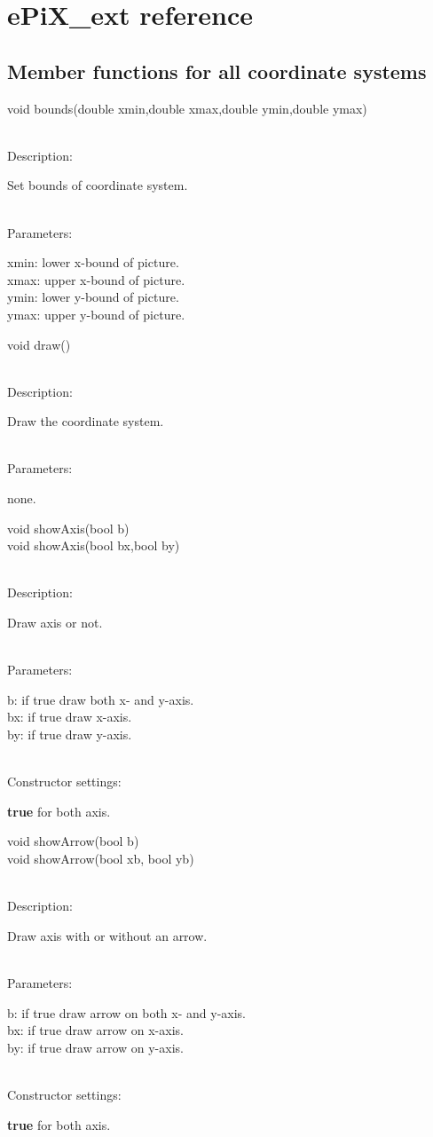 \documentclass[12pt,a4paper]{article}
\newcommand{\memberitem}[1]{
                              \vspace{-0.5pc}
                              \end{minipage}\\
                              \phantom{M}#1:\\
                              \phantom{MM}
                              \begin{minipage}[t]{12cm}

                           }
\newcommand{\memdsc}{\memberitem{Description}}
\newcommand{\meminp}{\memberitem{Parameters}}
\newcommand{\memdef}{\memberitem{Constructor settings}}
\newenvironment{MemberDescr}
  {
    \begin{minipage}{15cm}
    \bf
  }
  {
    \end{minipage}
  }
\begin{document}
  \section{ePiX\_ext reference}

  \subsection{Member functions for all coordinate systems}

  \begin{MemberDescr}
    void bounds(double xmin,double xmax,double ymin,double ymax)\\
    \memdsc
      Set bounds of coordinate system.\\
    \meminp
      xmin: lower x-bound of picture.\\
      xmax: upper x-bound of picture.\\
      ymin: lower y-bound of picture.\\
      ymax: upper y-bound of picture.\\
  \end{MemberDescr}

  \begin{MemberDescr}
    void draw()\\
    \memdsc
      Draw the coordinate system.\\
    \meminp
      none.\\
  \end{MemberDescr}

  \begin{MemberDescr}
    void showAxis(bool b)\\
    void showAxis(bool bx,bool by)\\
    \memdsc
      Draw axis or not.\\
    \meminp
      b:  if true draw both x- and y-axis.\\
      bx: if true draw x-axis.\\
      by: if true draw y-axis.\\
    \memdef
      \textbf{true} for both axis.\\
  \end{MemberDescr}

  \begin{MemberDescr}
     void showArrow(bool b)\\
     void showArrow(bool xb, bool yb)\\
    \memdsc
      Draw axis with or without an arrow.\\
    \meminp
      b:  if true draw arrow on both x- and y-axis.\\
      bx: if true draw arrow on x-axis.\\
      by: if true draw arrow on y-axis.\\
    \memdef
      \textbf{true} for both axis.\\
  \end{MemberDescr}
\end{document}
